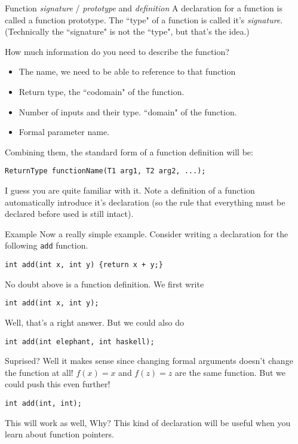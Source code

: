 \begin{frame}[fragile]{Function \textit{signature} / \textit{prototype} and \textit{definition}}
A declaration for a function is called a function prototype. The ``type" of a function is called it's \textit{signature}. (Technically the ``signature" is not the ``type", but that's the idea.)

How much information do you need to describe the function?
\begin{itemize}
	\item The name, we need to be able to reference to that function
	\item Return type, the ``codomain" of the function.
	\item Number of inputs and their type. ``domain" of the function.
	\item Formal parameter name.
\end{itemize}

Combining them, the standard form of a function definition will be:
\begin{verbatim}
ReturnType functionName(T1 arg1, T2 arg2, ...);
\end{verbatim}
I guess you are quite familiar with it. Note a definition of a function automatically introduce it's declaration (so the rule that everything must be declared before used is still intact).
\end{frame}

\begin{frame}[fragile]{Example}
Now a really simple example. Consider writing a declaration for the following \texttt{add} function.
\begin{verbatim}
int add(int x, int y) {return x + y;}
\end{verbatim}
No doubt above is a function definition. We first write
\begin{verbatim}
int add(int x, int y);
\end{verbatim}
Well, that's a right answer. But we could also do
\begin{verbatim}
int add(int elephant, int haskell);
\end{verbatim}
Suprised? Well it makes sense since changing formal arguments doesn't change the function at all! $f(x) = x$ and $f(z) = z$ are the same function. But we could push this even further!
\begin{verbatim}
int add(int, int);
\end{verbatim}
This will work as well, Why? This kind of declaration will be useful when you learn about function pointers.
\end{frame}


